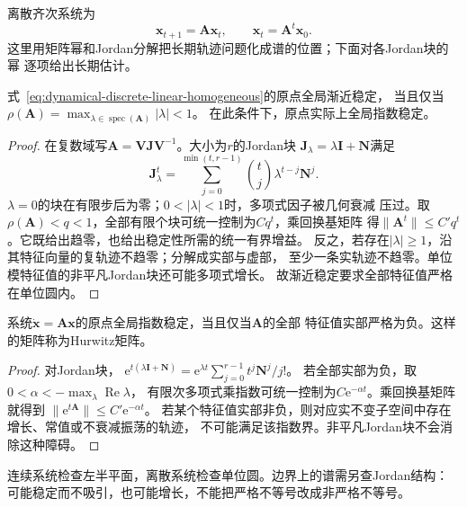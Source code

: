 离散齐次系统为
\begin{equation}
  \bm x_{t+1}=\bm A\bm x_t,\qquad \bm x_t=\bm A^t\bm x_0.
  \label{eq:dynamical-discrete-linear-homogeneous}
\end{equation}
这里用矩阵幂和Jordan分解把长期轨迹问题化成谱的位置；下面对各Jordan块的幂
逐项给出长期估计。
\begin{theorem}[离散线性系统的渐近稳定性]
  \label{thm:dynamical-discrete-spectral-stability}
  式~\eqref{eq:dynamical-discrete-linear-homogeneous}的原点全局渐近稳定，
  当且仅当$\rho(\bm A)=\max_{\lambda\in\operatorname{spec}(\bm A)}|\lambda|<1$。
  在此条件下，原点实际上全局指数稳定。
\end{theorem}
\begin{proof}
  在复数域写$\bm A=\bm V\bm J\bm V^{-1}$。大小为$r$的Jordan块
  $\bm J_\lambda=\lambda\bm I+\bm N$满足
  \[
    \bm J_\lambda^t
      =\sum_{j=0}^{\min(t,r-1)}\binom tj\lambda^{t-j}\bm N^j.
  \]
  $\lambda=0$的块在有限步后为零；$0<|\lambda|<1$时，多项式因子被几何衰减
  压过。取$\rho(\bm A)<q<1$，全部有限个块可统一控制为$Cq^t$，乘回换基矩阵
  得$\|\bm A^t\|\leq C' q^t$。它既给出趋零，也给出稳定性所需的统一有界增益。
  反之，若存在$|\lambda|\geq1$，沿其特征向量的复轨迹不趋零；分解成实部与虚部，
  至少一条实轨迹不趋零。单位模特征值的非平凡Jordan块还可能多项式增长。
  故渐近稳定要求全部特征值严格在单位圆内。
\end{proof}

\begin{theorem}[连续线性系统的指数稳定性]
  \label{thm:dynamical-continuous-spectral-stability}
  系统$\dot{\bm x}=\bm A\bm x$的原点全局指数稳定，当且仅当$\bm A$的全部
  特征值实部严格为负。这样的矩阵称为Hurwitz矩阵。
\end{theorem}
\begin{proof}
  对Jordan块，
  $\mathrm e^{t(\lambda\bm I+\bm N)}
   =\mathrm e^{\lambda t}\sum_{j=0}^{r-1}t^j\bm N^j/j!$。
  若全部实部为负，取$0<\alpha<-\max_\lambda\operatorname{Re}\lambda$，
  有限次多项式乘指数可统一控制为$C\mathrm e^{-\alpha t}$。乘回换基矩阵就得到
  $\|\mathrm e^{t\bm A}\|\leq C'\mathrm e^{-\alpha t}$。
  若某个特征值实部非负，则对应实不变子空间中存在增长、常值或不衰减振荡的轨迹，
  不可能满足该指数界。非平凡Jordan块不会消除这种障碍。
\end{proof}
连续系统检查左半平面，离散系统检查单位圆。边界上的谱需另查Jordan结构：
可能稳定而不吸引，也可能增长，不能把严格不等号改成非严格不等号。

